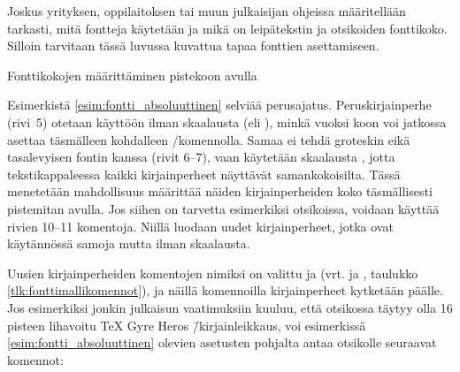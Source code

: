 Joskus yrityksen, oppilaitoksen tai muun julkaisijan ohjeissa
määritellään tarkasti, mitä fontteja käytetään ja mikä on leipätekstin
ja otsikoiden fonttikoko. Silloin tarvitaan tässä luvussa kuvattua tapaa
fonttien asettamiseen.

\begin{esimerkki}
\caption{Fonttikokojen määrittäminen pistekoon avulla}
\label{esim:fontti_absoluuttinen}
\end{esimerkki}

Esimerkistä \ref{esim:fontti_absoluuttinen} selviää perus\-ajatus.
Peruskirjainperhe (rivi~5) otetaan käyttöön ilman skaalausta (eli
), minkä vuoksi koon voi jatkossa asettaa täsmälleen
kohdalleen \-/komennolla. Samaa ei tehdä groteskin
eikä tasalevyisen fontin kanssa (rivit 6--7), vaan käytetään skaalausta
, jotta tekstikappaleessa kaikki kirjainperheet
näyttävät samankokoisilta. Tässä menetetään mahdollisuus määrittää
näiden kirjainperheiden koko täsmällisesti pistemitan avulla. Jos siihen
on tarvetta esimerkiksi otsikoissa, voidaan käyttää rivien 10--11
komentoja. Niillä luodaan uudet kirjainperheet, jotka ovat käytännössä
samoja mutta ilman skaalausta.

Uusien kirjainperheiden komentojen nimiksi on valittu  ja  (vrt. 
ja , taulukko \ref{tlk:fonttimallikomennot}), ja
näillä komennoilla kirjainperheet kytketään päälle. Jos esimerkiksi
jonkin julkaisun vaatimuksiin kuuluu, että otsikossa täytyy olla 16
pisteen lihavoitu TeX Gyre Heros \=/kirjainleikkaus, voi esimerkissä
\ref{esim:fontti_absoluuttinen} olevien asetusten pohjalta antaa
otsikolle seuraavat komennot:

